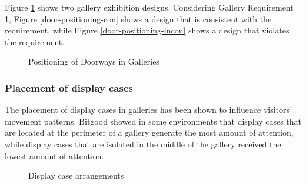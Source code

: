 \documentclass[12pt]{ucthesis}
\begin{document}
Figure \ref{museum-doors} shows two gallery exhibition designs. Considering Gallery Requirement 1, Figure \ref{door-positioning-con} shows a design that is consistent with the requirement, while Figure \ref{door-positioning-incon} shows a design that violates the requirement.
\begin{figure}[H]
 \centering
 \hspace{6 mm}
 \label{melton}
 \caption{Positioning of Doorways in Galleries}
\label{museum-doors}
\end{figure}


\subsubsection{Placement of display cases}
The placement of display cases in galleries has been shown to influence visitors' movement patterns. Bitgood \cite{Bitgood92} showed in some environments that display cases that are located at the perimeter of a gallery generate the most amount of attention, while display cases that are isolated in the middle of the gallery received the lowest amount of attention.

\begin{figure}[H]
 \centering
 \hspace{10 mm}
 \caption{Display case arrangements}
\label{display-arrangement}
\end{figure}
 
\end{document}
